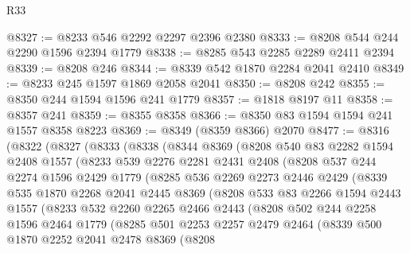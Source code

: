 \begin{lexlean}{R33}
\begin{coremodule}
@8327 := @8233 @546 @2292 @2297 @2396 @2380
@8333 := @8208 @544 @244 @2290 @1596 @2394 @1779
@8338 := @8285 @543 @2285 @2289 @2411 @2394
@8339 := @8208 @246
@8344 := @8339 @542 @1870 @2284 @2041 @2410
@8349 := @8233 @245 @1597 @1869 @2058 @2041
@8350 := @8208 @242
@8355 := @8350 @244 @1594 @1596 @241 @1779
@8357 := @1818 @8197 @11
@8358 := @8357 @241
@8359 := @8355 @8358
@8366 := @8350 @83 @1594 @1594 @241 @1557 @8358 @8223
@8369 := @8349 (@8359 @8366) @2070
@8477 := @8316
    (@8322
      (@8327
        (@8333
          (@8338
            (@8344
              @8369
              (@8208
                @540
                @83
                @2282
                @1594
                @2408
                @1557
                (@8233
                  @539
                  @2276
                  @2281
                  @2431
                  @2408
                  (@8208
                    @537
                    @244
                    @2274
                    @1596
                    @2429
                    @1779
                    (@8285
                      @536
                      @2269
                      @2273
                      @2446
                      @2429
                      (@8339
                        @535
                        @1870
                        @2268
                        @2041
                        @2445
                        @8369
                        (@8208
                          @533
                          @83
                          @2266
                          @1594
                          @2443
                          @1557
                          (@8233
                            @532
                            @2260
                            @2265
                            @2466
                            @2443
                            (@8208
                              @502
                              @244
                              @2258
                              @1596
                              @2464
                              @1779
                              (@8285
                                @501
                                @2253
                                @2257
                                @2479
                                @2464
                                (@8339
                                  @500
                                  @1870
                                  @2252
                                  @2041
                                  @2478
                                  @8369
                                  (@8208

\end{coremodule}
\end{lexlean}
